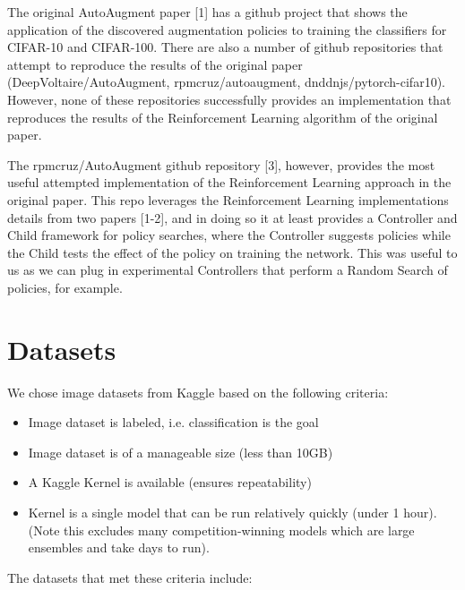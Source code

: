 \documentclass[10pt,twocolumn,letterpaper]{article}
\begin{document}
The original AutoAugment paper [1] has a github project that shows the application of the discovered augmentation policies to training the classifiers for CIFAR-10 and CIFAR-100.  There are also a number of github repositories that attempt to reproduce the results of the original paper (DeepVoltaire/AutoAugment, rpmcruz/autoaugment, dnddnjs/pytorch-cifar10).  However, none of these repositories successfully provides an implementation that reproduces the results of the Reinforcement Learning algorithm of the original paper.

The rpmcruz/AutoAugment github repository [3], however, provides the most useful attempted implementation of the Reinforcement Learning approach in the original paper.  This repo leverages the Reinforcement Learning implementations details from two papers [1-2], and in doing so it at least provides a Controller and Child framework for policy searches, where the Controller suggests policies while the Child tests the effect of the policy on training the network.  This was useful to us as we can plug in experimental Controllers that perform a Random Search of policies, for example.

\section{Datasets}

We chose image datasets from Kaggle based on the following criteria:

\begin{itemize}
  \item Image dataset is labeled, i.e. classification is the goal
  \item Image dataset is of a manageable size (less than 10GB)
  \item A Kaggle Kernel is available (ensures repeatability)
  \item Kernel is a single model that can be run relatively quickly (under 1 hour).  (Note this excludes many competition-winning models which are large ensembles and take days to run).
\end{itemize}

The datasets that met these criteria include:
\end{document}
